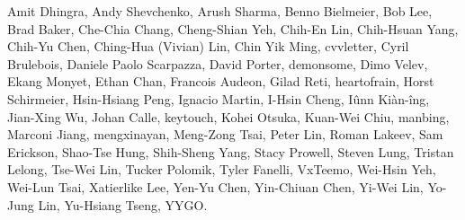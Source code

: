 Amit Dhingra,                  %
Andy Shevchenko,               %
Arush Sharma,                  %
Benno Bielmeier,               %
Bob Lee,                       %
Brad Baker,                    %
Che-Chia Chang,                %
Cheng-Shian Yeh,               %
Chih-En Lin,                   %
Chih-Hsuan Yang,               %
Chih-Yu Chen,                  %
Ching-Hua (Vivian) Lin,        %
Chin Yik Ming,                 %
cvvletter,                     %
Cyril Brulebois,               %
Daniele Paolo Scarpazza,       %
David Porter,                  %
demonsome,                     %
Dimo Velev,                    %
Ekang Monyet,                  %
Ethan Chan,                    %
Francois Audeon,               %
Gilad Reti,                    %
heartofrain,                   %
Horst Schirmeier,              %
Hsin-Hsiang Peng,              %
Ignacio Martin,                %
I-Hsin Cheng,                  %
Iûnn Kiàn-îng,                 %
Jian-Xing Wu,                  %
Johan Calle,                   %
keytouch,                      %
Kohei Otsuka,                  %
Kuan-Wei Chiu,                 %
manbing,                       %
Marconi Jiang,                 %
mengxinayan,                   %
Meng-Zong Tsai,                %
Peter Lin,                     %
Roman Lakeev,                  %
Sam Erickson,                  %
Shao-Tse Hung,                 %
Shih-Sheng Yang,               %
Stacy Prowell,                 %
Steven Lung,                   %
Tristan Lelong,                %
Tse-Wei Lin,                   %
Tucker Polomik,                %
Tyler Fanelli,                 %
VxTeemo,                       %
Wei-Hsin Yeh,                  %
Wei-Lun Tsai,                  %
Xatierlike Lee,                %
Yen-Yu Chen,                   %
Yin-Chiuan Chen,               %
Yi-Wei Lin,                    %
Yo-Jung Lin,                   %
Yu-Hsiang Tseng,               %
YYGO.                          %
